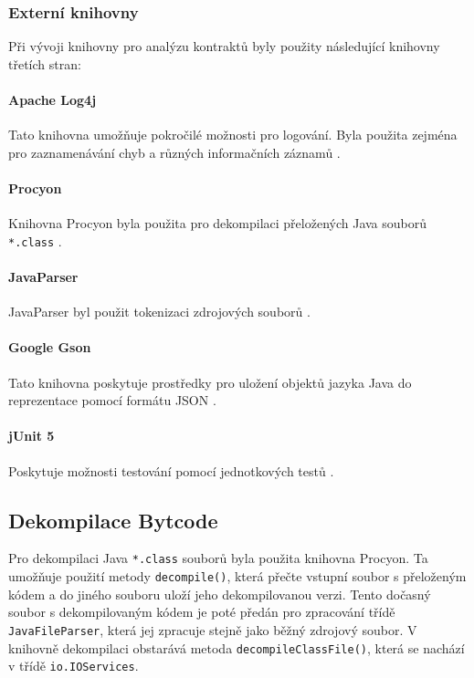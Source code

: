 		\subsubsection{Externí knihovny}
			Při vývoji knihovny pro analýzu kontraktů byly použity následující knihovny třetích stran:
			
			\paragraph{Apache Log4j} 
				Tato knihovna umožňuje pokročilé možnosti pro logování. Byla použita zejména pro zaznamenávání chyb a různých informačních záznamů \cite{log4j}.
				
			\paragraph{Procyon}
				Knihovna Procyon byla použita pro dekompilaci přeložených Java souborů \texttt{*.class} \cite{procyon}.
				
			\paragraph{JavaParser}
				JavaParser byl použit tokenizaci zdrojových souborů \cite{javaparser}. 
				
			\paragraph{Google Gson}
				Tato knihovna poskytuje prostředky pro uložení objektů jazyka Java do reprezentace pomocí formátu JSON \cite{gson}. 
				
			\paragraph{jUnit 5}
				Poskytuje možnosti testování pomocí jednotkových testů \cite{junit}.    	 
		

		\subsection{Dekompilace Bytcode}
			Pro dekompilaci Java \texttt{*.class} souborů byla použita knihovna Procyon. Ta umožňuje použití metody \texttt{decompile()}, která přečte vstupní soubor s přeloženým kódem a do jiného souboru uloží jeho dekompilovanou verzi. Tento dočasný soubor s dekompilovaným kódem je poté předán pro zpracování třídě \texttt{JavaFileParser}, která jej zpracuje stejně jako běžný zdrojový soubor. V knihovně dekompilaci obstarává metoda \texttt{decompileClassFile()}, která se nachází v třídě \texttt{io.IOServices}.
					

